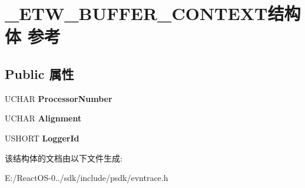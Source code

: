 \hypertarget{struct___e_t_w___b_u_f_f_e_r___c_o_n_t_e_x_t}{}\section{\+\_\+\+E\+T\+W\+\_\+\+B\+U\+F\+F\+E\+R\+\_\+\+C\+O\+N\+T\+E\+X\+T结构体 参考}
\label{struct___e_t_w___b_u_f_f_e_r___c_o_n_t_e_x_t}
\subsection*{Public 属性}
\begin{DoxyCompactItemize}
\item 
\mbox{\label{struct___e_t_w___b_u_f_f_e_r___c_o_n_t_e_x_t_ab29b50ceacdeb9e8687ff733f165a65a}} 
U\+C\+H\+AR {\bfseries Processor\+Number}
\item 
\mbox{\label{struct___e_t_w___b_u_f_f_e_r___c_o_n_t_e_x_t_a068b71491ef7b78ebfc7c1a73a118db5}} 
U\+C\+H\+AR {\bfseries Alignment}
\item 
\mbox{\label{struct___e_t_w___b_u_f_f_e_r___c_o_n_t_e_x_t_ad26175d21af76f524a517ebdefa260c9}} 
U\+S\+H\+O\+RT {\bfseries Logger\+Id}
\end{DoxyCompactItemize}


该结构体的文档由以下文件生成\+:\begin{DoxyCompactItemize}
\item 
E\+:/\+React\+O\+S-\/0../sdk/include/psdk/evntrace.\+h\end{DoxyCompactItemize}
